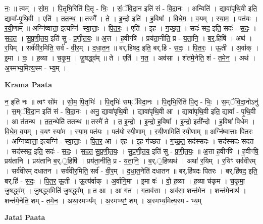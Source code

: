 \documentclass[17pt]{extarticle}
\begin{document}
नः॒ ॥ त्वम् । सो॒म॒ । पि॒तृभि॒रिति॑ पि॒तृ - भिः॒ । सं॒ॅवि॒दा॒न इति॑ सं - वि॒दा॒नः । अन्विति॑ । द्यावा॑पृथि॒वी इति॒ द्यावा᳚-पृ॒थि॒वी । एति॑ । त॒त॒न्थ॒ ॥ तस्मै᳚ । ते॒ । इ॒न्दो॒ इति॑ । ह॒विषा᳚ । वि॒धे॒म॒ । व॒यम् । स्या॒म॒ । पत॑यः । र॒यी॒णाम् ॥ अग्नि॑ष्वात्ता॒ इत्यग्नि॑- स्वा॒त्ताः॒ । पि॒त॒रः॒ । एति॑ । इ॒ह । ग॒च्छ॒त॒ । सदः॑ सद॒ इति॒ सदः॑ - स॒दः॒ । स॒द॒त॒ । सु॒प्र॒णी॒त॒य॒ इति॑ सु - प्र॒णी॒त॒यः॒ ॥ अ॒त्त । ह॒वीꣳषि॑ । प्रय॑ता॒नीति॒ प्र - य॒ता॒नि॒ । ब॒र्॒.हिषि॑ । अथ॑ । र॒यिम् । सर्व॑वीर॒मिति॒ सर्व॑ - वी॒र॒म् । द॒धा॒त॒न॒ ॥ बर्.हि॑षद॒ इति॒ बर्.हि॑ - स॒दः॒ । पि॒त॒रः॒ । ऊ॒ती । अ॒र्वाक् । इ॒मा । वः॒ । ह॒व्या । च॒कृ॒म॒ । जु॒षद्ध्व᳚म् ॥ ते । एति॑ । ग॒त॒ । अव॑सा । शंत॑मे॒नेति॒ शं - त॒मे॒न॒ । अथ॑ । अ॒स्मभ्य॒मित्य॒स्म - भ्य॒म् ।  \newline


\textbf{Krama Paata} \newline

न॒ इति॑ नः ॥ त्वꣳ सो॑म । सो॒म॒ पि॒तृभिः॑ । पि॒तृभिः॑ सम्ॅविदा॒नः । पि॒तृभि॒रिति॑ पि॒तृ - भिः॒ । स॒म्ॅवि॒दा॒नोऽनु॑ । स॒म्ॅवि॒दा॒न इति॑ सं - वि॒दा॒नः । अनु॒ द्यावा॑पृथि॒वी । द्यावा॑पृथि॒वी आ । द्यावा॑पृथि॒वी इति॒ द्यावा᳚ - पृ॒थि॒वी । आ त॑तन्थ । त॒त॒न्थेति॑ ततन्थ ॥ तस्मै॑ ते । त॒ इ॒न्दो॒ । इ॒न्दो॒ ह॒विषा᳚ । इ॒न्दो॒ इती᳚न्दो । ह॒विषा॑ विधेम । वि॒धे॒म॒ व॒यम् । व॒यꣳ स्या॑म । स्या॒म॒ पत॑यः । पत॑यो रयी॒णाम् । र॒यी॒णामिति॑ रयी॒णाम् ॥ अग्नि॑ष्वात्ताः पितरः । अग्नि॑ष्वात्ता॒ इत्यग्नि॑ - स्वा॒त्ताः॒ । पि॒त॒र॒ आ । एह । इ॒ह ग॑च्छत । ग॒च्छ॒त॒ सद॑स्सदः । सद॑स्सदः सदत । सद॑स्सद॒ इति॒ सदः॑ - स॒दः॒ । स॒द॒त॒ सु॒प्र॒णी॒त॒यः॒ । सु॒प्र॒णी॒त॒य॒ इति॑ सु - प्र॒णी॒त॒यः॒ ॥ अ॒त्ता ह॒वीꣳषि॑ । ह॒वीꣳषि॒ प्रय॑तानि । प्रय॑तानि ब॒र्.॒हिषि॑ । प्रय॑ता॒नीति॒ प्र - य॒ता॒नि॒ । ब॒र्.॒हिष्यथ॑ । अथा॑ र॒यिम् । र॒यिꣳ सर्व॑वीरम् । सर्व॑वीरम् दधातन । सर्व॑वीर॒मिति॒ सर्व॑ - वी॒र॒म् । द॒धा॒त॒नेति॑ दधातन ॥ बर्.हि॑षदः पितरः । बर्.हि॑षद॒ इति॒ बर्.हि॑ - स॒दः॒ । पि॒त॒र॒ ऊ॒ती । ऊ॒त्य॑र्वाक् । अ॒र्वागि॒मा । इ॒मा वः॑ । वो॒ ह॒व्या । ह॒व्या च॑कृम । च॒कृ॒मा॒ जु॒षद्ध्व᳚म् । जु॒षद्ध्व॒मिति॑ जु॒षद्ध्व᳚म् ॥ त आ । आ ग॑त । ग॒ताव॑सा । अव॑सा॒ शन्त॑मेन । शन्त॑मे॒नाथ॑ । शन्त॑मे॒नेति॒ शम् - त॒मे॒न॒ । अथा॒स्मभ्य᳚म् । अ॒स्मभ्यꣳ॒॒ शम् । अ॒स्मभ्य॒मित्य॒स्म - भ्य॒म् \newline

\textbf{Jatai Paata} \newline
\end{document}
